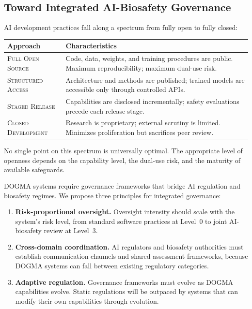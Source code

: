 \subsection{Toward Integrated AI-Biosafety Governance}

\begin{dogmadef}
AI development practices fall along a spectrum from fully open to fully closed:
\begin{center}
\renewcommand{\arraystretch}{1.15}
\begin{tabularx}{0.92\textwidth}{l Y}
\toprule
\textbf{Approach} & \textbf{Characteristics} \\
\midrule
\textsc{Full Open Source} & Code, data, weights, and training procedures are public. Maximum reproducibility; maximum dual-use risk. \\
\textsc{Structured Access} & Architecture and methods are published; trained models are accessible only through controlled APIs. \\
\textsc{Staged Release} & Capabilities are disclosed incrementally; safety evaluations precede each release stage. \\
\textsc{Closed Development} & Research is proprietary; external scrutiny is limited. Minimizes proliferation but sacrifices peer review. \\
\bottomrule
\end{tabularx}
\end{center}
No single point on this spectrum is universally optimal.
The appropriate level of openness depends on the capability level, the dual-use risk, and the maturity of available safeguards.
\end{dogmadef}

DOGMA systems require governance frameworks that bridge AI regulation and biosafety regimes.
We propose three principles for integrated governance:
\begin{enumerate}[leftmargin=1.8em]
  \item \textbf{Risk-proportional oversight.} Oversight intensity should scale with the system's risk level, from standard software practices at Level~0 to joint AI-biosafety review at Level~3.
  \item \textbf{Cross-domain coordination.} AI regulators and biosafety authorities must establish communication channels and shared assessment frameworks, because DOGMA systems can fall between existing regulatory categories.
  \item \textbf{Adaptive regulation.} Governance frameworks must evolve as DOGMA capabilities evolve.
  Static regulations will be outpaced by systems that can modify their own capabilities through evolution.
\end{enumerate}

